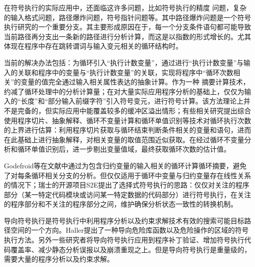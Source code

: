 在符号执行的实际应用中，还面临这许多问题，比如符号执行的精度
问题，复杂的输入格式问题，路径爆炸问题，符号指针问题等。其中路径爆炸问题是一个符号执行研究的一个重要分支。其主要形成原因在于，每一个分支条件语句都可能导致当前路径再分支出一条新的路径进行分析计算，而这是以指数的形式增长的。尤其体现在程序中存在跳转谓词与输入变元相关的循环结构时。

当前的解决办法包括：为循环引入“执行计数变量”，通过进行“执行计数变量”与输入的关联和程序中的变量与“执行计数变量”的关联，实现将程序中“循环次数相关”的变量的值完全通过输入相关属性表达的抽象计算。作为一种
摘要计算技术，约减了循环处理中的分析计算量；在对大量实际应用程序分析的基础上，仅仅为输入的“长度”和“部分输入前缀字符”引入符号变元，进行符号计算。该方法理论上并不是完备的，但实际应用中能覆盖较多的缓冲区溢出情形；有些相关研究提出综合使用程序切片、抽象解释、循环不变量计算和循环单值识别等技术对循环执行次数的上界进行估算：利用程序切片获取与循环结束判断条件相关的变量和语句，进而在此基础上进行抽象解释，对相关变量的取值范围近似获取。在经过循环不变量分析和循环单值识别后，进一步剔出变量值域，最终获取循环次数的估计值。

Godefroid等在文献中通过为包含归约变量的输入相关的循环计算循环摘要，避免了对每条循环相关分支的分析。但仅仅适用于循环中变量与归约变量存在线性关系的情况下；瑞士的开源项目S2E提出了选择式符号执行的思路：仅仅对关注的程序部分（某一特定代码模块或访问某一特定数据的代码部分）进行符号执行，在关注的程序部分和不关注的程序部分之间，维护确保分析状态一致性的转换机制。


导向符号执行是符号执行中利用程序分析以及约束求解技术有效的搜索可能目标路径空间的一个方向。Haller提出了一种导向危险库函数以及危险操作的区域的符号执行方法。另外一些研究者将导向符号执行应用到程序补丁验证、增加符号执行代码覆盖率、减少静态分析误报以及崩溃重现之上。但是导向符号执行是重量级的，需要大量的程序分析以及约束求解。


